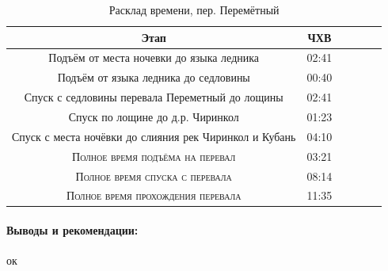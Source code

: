 \begin{table}[h!]
	\centering
	\begin{tabular}{|c|c|c|c|c|c|} 
		\hline 
		Этап & ЧХВ \\ 	
		\hline 
		Подъём от места ночевки до языка ледника  & 02:41 \\
		Подъём от языка ледника до седловины  & 00:40 \\
		Спуск с седловины перевала Переметный до лощины & 02:41\\ 
		Спуск по лощине до д.р. Чиринкол & 01:23\\ 
		Спуск с места ночёвки до слияния рек Чиринкол и Кубань & 04:10 \\
		
		\hline
		\textsc{Полное время подъёма на перевал  }& 03:21\\
		\textsc{Полное время спуска с перевала }& 08:14 \\
		\textsc{Полное время прохождения перевала }& 11:35 \\
		\hline
	\end{tabular}
	\caption{Расклад времени, пер. Перемётный}
\end{table}

\paragraph{Выводы и рекомендации:} ок

\clearpage